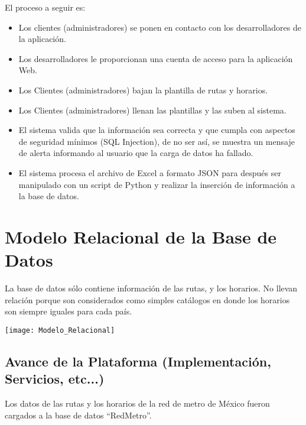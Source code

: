 \documentclass[12pt]{article} %
\begin{document}
El proceso a seguir es:	\\
\begin{itemize}
\item Los clientes (administradores) se ponen en contacto con los desarrolladores de la aplicación.

\item Los desarrolladores le proporcionan una cuenta de acceso para la aplicación Web.

\item Los Clientes (administradores) bajan la plantilla de rutas y horarios.

\item Los Clientes (administradores) llenan las plantillas y las suben al sistema.

\item El sistema valida que la información sea correcta y que cumpla con aspectos de seguridad mínimos (SQL Injection), de no ser así, se muestra un mensaje de alerta informando al usuario que la carga de datos ha fallado.

\item El sistema procesa el archivo de Excel a formato JSON para después ser manipulado con un script de Python y realizar la inserción de información a la base de datos.
\end{itemize}
\pagebreak


\section{Modelo Relacional de la Base de Datos} %

La base de datos sólo contiene información de las rutas, y los horarios. No llevan relación porque son considerados como simples catálogos en donde los horarios son siempre iguales para cada país.\\

\begin{center}
	\texttt{[image: Modelo\_Relacional]}
\end{center}
\pagebreak

\subsection{Avance de la Plataforma (Implementación, Servicios, etc...)}


Los datos de las rutas y los horarios de la red de metro de México fueron cargados a la base de datos “RedMetro”.
\end{document}
